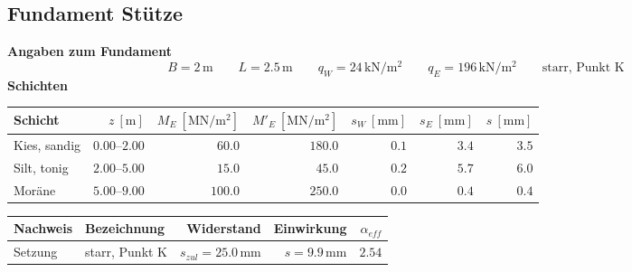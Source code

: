 \documentclass[11pt,a4paper]{article}
\begin{document}
\subsection{Fundament Stütze}
\noindent\textbf{Angaben zum Fundament}
\begin{equation*}
B = 2\,\mathrm{m} \qquad L = 2.5\,\mathrm{m} \qquad q_W = 24\,\mathrm{kN}/\mathrm{m}^{2} \qquad q_E = 196\,\mathrm{kN}/\mathrm{m}^{2} \qquad \text{starr, Punkt K}
\end{equation*}
\noindent\textbf{Schichten}
\begin{longtable}{lrrrrrr}
\hline
Schicht & $z\ [\mathrm{m}]$ & $M_E\ [\mathrm{MN}/\mathrm{m}^{2}]$ & $M'_E\ [\mathrm{MN}/\mathrm{m}^{2}]$ & $s_W\ [\mathrm{mm}]$ & $s_E\ [\mathrm{mm}]$ & $s\ [\mathrm{mm}]$ \\
\hline
\endhead
Kies, sandig & $0.00 – 2.00$ & $60.0$ & $180.0$ & $0.1$ & $3.4$ & $3.5$ \\
Silt, tonig & $2.00 – 5.00$ & $15.0$ & $45.0$ & $0.2$ & $5.7$ & $6.0$ \\
Moräne & $5.00 – 9.00$ & $100.0$ & $250.0$ & $0.0$ & $0.4$ & $0.4$ \\
\hline
\end{longtable}
\begin{xltabular}{\linewidth}{>{\raggedright\arraybackslash}X>{\raggedright\arraybackslash}Xrrr}
\hline
Nachweis & Bezeichnung & Widerstand & Einwirkung & $\alpha_{eff}$ \\
\hline
\endhead
Setzung & starr, Punkt K & $s_{zul} = 25.0\,\mathrm{mm}$ & $s = 9.9\,\mathrm{mm}$ & $2.54$ \\
\hline
\end{xltabular}
\end{document}
